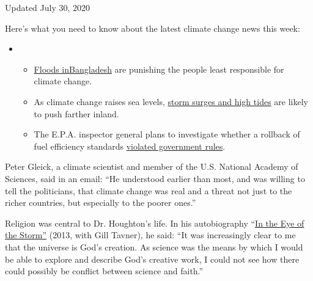 Updated July 30, 2020

Here's what you need to know about the latest climate change news this
week:

\begin{itemize}
\item
  \begin{itemize}
  \tightlist
  \item
    \href{https://www.nytimes3xbfgragh.onion/2020/07/30/climate/bangladesh-floods.html?action=click\&pgtype=Article\&state=default\&region=MAIN_CONTENT_1\&context=storylines_keepup}{Floods
    in}\href{https://www.nytimes3xbfgragh.onion/2020/07/30/climate/bangladesh-floods.html?action=click\&pgtype=Article\&state=default\&region=MAIN_CONTENT_1\&context=storylines_keepup}{Bangladesh}
    are punishing the people least responsible for climate change.
  \item
    As climate change raises sea levels,
    \href{https://www.nytimes3xbfgragh.onion/2020/07/30/climate/sea-level-inland-floods.html?action=click\&pgtype=Article\&state=default\&region=MAIN_CONTENT_1\&context=storylines_keepup}{storm
    surges and high tides} are likely to push farther inland.
  \item
    The E.P.A. inspector general plans to investigate whether a rollback
    of fuel efficiency standards
    \href{https://www.nytimes3xbfgragh.onion/2020/07/27/climate/trump-fuel-efficiency-rule.html?action=click\&pgtype=Article\&state=default\&region=MAIN_CONTENT_1\&context=storylines_keepup}{violated
    government rules}.
  \end{itemize}
\end{itemize}

Peter Gleick, a climate scientist and member of the U.S. National
Academy of Sciences, said in an email: ``He understood earlier than
most, and was willing to tell the politicians, that climate change was
real and a threat not just to the richer countries, but especially to
the poorer ones.''

Religion was central to Dr. Houghton's life. In his autobiography
``\href{https://www.amazon.com/Eye-Storm-Autobiography-John-Houghton/dp/0745955843/ref=tmm_pap_swatch_0?_encoding=UTF8\&qid=\&sr=\#reader_0745955843}{In
the Eye of the Storm''} (2013, with Gill Tavner), he said: ``It was
increasingly clear to me that the universe is God's creation. As science
was the means by which I would be able to explore and describe God's
creative work, I could not see how there could possibly be conflict
between science and faith.''

